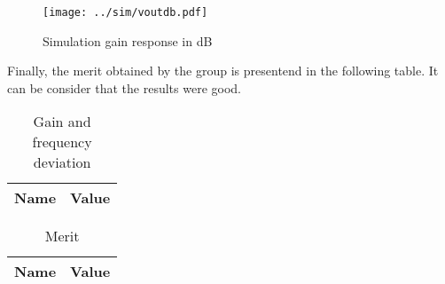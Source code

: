 \begin{figure}[H] \centering
\texttt{[image: ../sim/voutdb.pdf]}
\caption{Simulation gain response in dB}
\label{fig:ng6}
\end{figure}

\par Finally, the merit obtained by the group is presentend in the following table. It can be consider that the results were good.

\begin{table}[!ht]
  \centering
  \begin{tabular}{|l|r|}
    \hline    
    {\bf Name} & {\bf Value } \\ \hline
    
  \end{tabular}
  \caption{Gain and frequency deviation}
  \label{tab:ng2}
\end{table}

\begin{table}[!ht]
  \centering
  \begin{tabular}{|l|r|}
    \hline    
    {\bf Name} & {\bf Value} \\ \hline
    
  \end{tabular}
  \caption{Merit}
  \label{tab:ng5}
\end{table}


